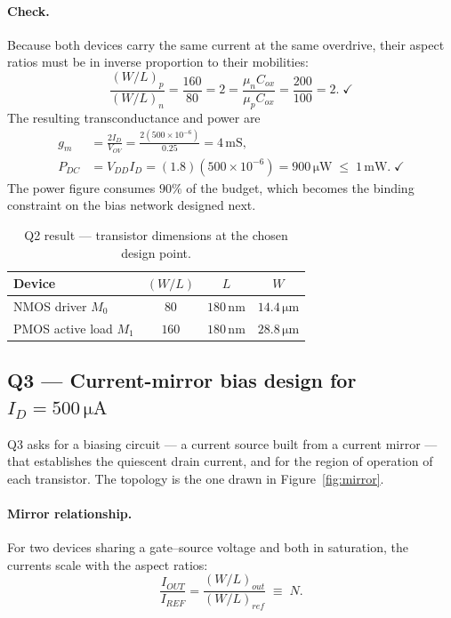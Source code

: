 \documentclass[12pt,a4paper]{article}
\newcommand{\U}[1]{\,\mathrm{#1}}
\newcommand{\WLi}[1]{\left(W/L\right)_{#1}}
\begin{document}
\paragraph{Check.}
Because both devices carry the same current at the same overdrive, their
aspect ratios must be in inverse proportion to their mobilities:
\[
\frac{\WLi{p}}{\WLi{n}} = \frac{160}{80} = 2
= \frac{\mu_n C_{ox}}{\mu_p C_{ox}} = \frac{200}{100} = 2 .\;\checkmark
\]
The resulting transconductance and power are
\begin{align*}
g_m    &= \frac{2 I_D}{V_{OV}} = \frac{2(500\times10^{-6})}{0.25} = 4\U{mS},\\
P_{DC} &= V_{DD} I_D = (1.8)(500\times10^{-6}) = 900\U{\mu W}
          \;\leq\; 1\U{mW}.\;\checkmark
\end{align*}
The power figure consumes $90\%$ of the budget, which becomes the binding
constraint on the bias network designed next.

\begin{table}[H]
\centering
\caption{Q2 result --- transistor dimensions at the chosen design point.}
\label{tab:q2}
\begin{tabular}{lccc}
\toprule
\textbf{Device} & $(W/L)$ & $L$ & $W$ \\
\midrule
NMOS driver $M_0$      & $80$  & $180\U{nm}$ & $14.4\U{\mu m}$ \\
PMOS active load $M_1$ & $160$ & $180\U{nm}$ & $28.8\U{\mu m}$ \\
\bottomrule
\end{tabular}
\end{table}

\subsection{Q3 --- Current-mirror bias design for $I_D = 500\U{\mu A}$}
\label{sec:q3}
Q3 asks for a biasing circuit --- a current source built from a current mirror
--- that establishes the quiescent drain current, and for the region of
operation of each transistor. The topology is the one drawn in
Figure~\ref{fig:mirror}.

\paragraph{Mirror relationship.}
For two devices sharing a gate--source voltage and both in saturation, the
currents scale with the aspect ratios:
\begin{equation}
\frac{I_{OUT}}{I_{REF}} = \frac{\WLi{out}}{\WLi{ref}} \;\equiv\; N .
\label{eq:mirror}
\end{equation}
\end{document}
